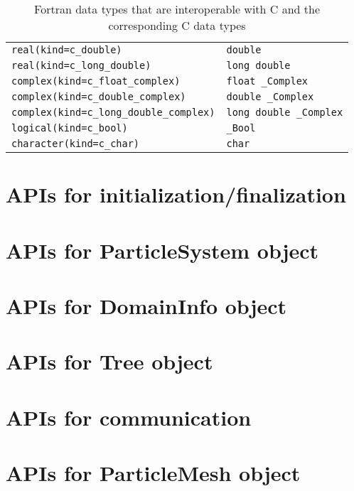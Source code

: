 \documentclass[12pt,a4paper,dvipdfmx]{book} %
\begin{document}
\begin{table}[H]
\begin{tabularx}{\linewidth}{XX}
\texttt{real(kind=c\_double)}                   & \texttt{double}\\
\texttt{real(kind=c\_long\_double)}             & \texttt{long double}\\
\texttt{complex(kind=c\_float\_complex)}        & \texttt{float \_Complex}\\
\texttt{complex(kind=c\_double\_complex)}       & \texttt{double \_Complex}\\
\texttt{complex(kind=c\_long\_double\_complex)} & \texttt{long double \_Complex}\\
\texttt{logical(kind=c\_bool)}                  & \texttt{\_Bool}\\
\texttt{character(kind=c\_char)}                & \texttt{char}\\
\bottomrule
\end{tabularx}
\caption{Fortran data types that are interoperable with C and the corresponding C data types}
\label{tbl:interoperable_data_types}
\end{table}
\clearpage

\section{APIs for initialization/finalization}
\label{sec:initfin_APIs}

\newpage
\section{APIs for ParticleSystem object}
\label{sec:psys_APIs}

\newpage
\section{APIs for DomainInfo object}
\label{sec:dinfo_APIs}

\newpage
\section{APIs for Tree object}
\label{sec:tree_APIs}

\newpage
\section{APIs for communication}
\label{sec:comm_APIs}

\newpage
\section{APIs for ParticleMesh object}
\label{sec:PM_APIs}

\newpage
\end{document}

